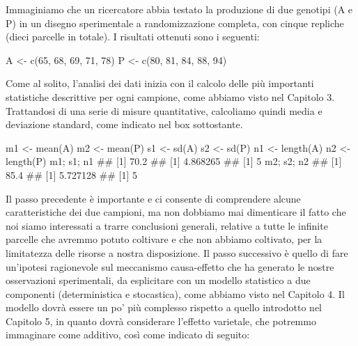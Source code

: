 \documentclass[a4paper,12pt,oneside]{book}
\newenvironment{Shaded}{\begin{snugshade}}{\end{snugshade}}
\newcommand{\DecValTok}[1]{#1}
\newcommand{\DocumentationTok}[1]{#1}
\newcommand{\OtherTok}[1]{#1}
\newcommand{\FunctionTok}[1]{#1}
\newcommand{\NormalTok}[1]{#1}
\begin{document}
Immaginiamo che un ricercatore abbia testato la produzione di due genotipi (A e P) in un disegno sperimentale a randomizzazione completa, con cinque repliche (dieci parcelle in totale). I risultati ottenuti sono i seguenti:

\begin{Shaded}
\begin{Highlighting}[]
\NormalTok{A }\OtherTok{\textless{}{-}} \FunctionTok{c}\NormalTok{(}\DecValTok{65}\NormalTok{, }\DecValTok{68}\NormalTok{, }\DecValTok{69}\NormalTok{, }\DecValTok{71}\NormalTok{, }\DecValTok{78}\NormalTok{)}
\NormalTok{P }\OtherTok{\textless{}{-}} \FunctionTok{c}\NormalTok{(}\DecValTok{80}\NormalTok{, }\DecValTok{81}\NormalTok{, }\DecValTok{84}\NormalTok{, }\DecValTok{88}\NormalTok{, }\DecValTok{94}\NormalTok{)}
\end{Highlighting}
\end{Shaded}

Come al solito, l'analisi dei dati inizia con il calcolo delle più importanti statistiche descrittive per ogni campione, come abbiamo visto nel Capitolo 3. Trattandosi di una serie di misure quantitative, calcoliamo quindi media e deviazione standard, come indicato nel box sottostante.

\begin{Shaded}
\begin{Highlighting}[]
\NormalTok{m1 }\OtherTok{\textless{}{-}} \FunctionTok{mean}\NormalTok{(A)}
\NormalTok{m2 }\OtherTok{\textless{}{-}} \FunctionTok{mean}\NormalTok{(P)}
\NormalTok{s1 }\OtherTok{\textless{}{-}} \FunctionTok{sd}\NormalTok{(A)}
\NormalTok{s2 }\OtherTok{\textless{}{-}} \FunctionTok{sd}\NormalTok{(P)}
\NormalTok{n1 }\OtherTok{\textless{}{-}} \FunctionTok{length}\NormalTok{(A)}
\NormalTok{n2 }\OtherTok{\textless{}{-}} \FunctionTok{length}\NormalTok{(P)}
\NormalTok{m1; s1; n1}
\DocumentationTok{\#\# [1] 70.2}
\DocumentationTok{\#\# [1] 4.868265}
\DocumentationTok{\#\# [1] 5}
\NormalTok{m2; s2; n2}
\DocumentationTok{\#\# [1] 85.4}
\DocumentationTok{\#\# [1] 5.727128}
\DocumentationTok{\#\# [1] 5}
\end{Highlighting}
\end{Shaded}

Il passo precedente è importante e ci consente di comprendere alcune caratteristiche dei due campioni, ma non dobbiamo mai dimenticare il fatto che noi siamo interessati a trarre conclusioni generali, relative a tutte le infinite parcelle che avremmo potuto coltivare e che non abbiamo coltivato, per la limitatezza delle risorse a nostra disposizione. Il passo successivo è quello di fare un'ipotesi ragionevole sul meccanismo causa-effetto che ha generato le nostre osservazioni sperimentali, da esplicitare con un modello statistico a due componenti (deterministica e stocastica), come abbiamo visto nel Capitolo 4. Il modello dovrà essere un po' più complesso rispetto a quello introdotto nel Capitolo 5, in quanto dovrà considerare l'effetto varietale, che potremmo immaginare come additivo, così come indicato di seguito:
\end{document}
